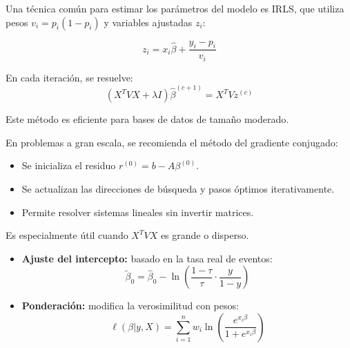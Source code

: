 \documentclass[12pt]{article}
\begin{document}
Una técnica común para estimar los parámetros del modelo es IRLS, que utiliza pesos $v_i = p_i(1 - p_i)$ y variables ajustadas $z_i$:

\begin{equation}
    z_i = x_i \hat{\beta} + \frac{y_i - p_i}{v_i}
\end{equation}

En cada iteración, se resuelve:
\begin{equation}
    (X^T V X + \lambda I) \hat{\beta}^{(c+1)} = X^T V z^{(c)}
\end{equation}

Este método es eficiente para bases de datos de tamaño moderado.

En problemas a gran escala, se recomienda el método del gradiente conjugado:

\begin{itemize}
    \item Se inicializa el residuo $r^{(0)} = b - A\beta^{(0)}$.
    \item Se actualizan las direcciones de búsqueda y pasos óptimos iterativamente.
    \item Permite resolver sistemas lineales sin invertir matrices.
\end{itemize}

Es especialmente útil cuando $X^T V X$ es grande o disperso.

\begin{itemize}
    \item \textbf{Ajuste del intercepto:} basado en la tasa real de eventos:
    \begin{equation}
        \tilde{\beta}_0 = \hat{\beta}_0 - \ln \left( \frac{1 - \tau}{\tau} \cdot \frac{y}{1 - y} \right)
    \end{equation}
    \item \textbf{Ponderación:} modifica la verosimilitud con pesos:
    \begin{equation}
        \ell(\beta|y,X) = \sum_{i=1}^n w_i \ln \left( \frac{e^{x_i \beta}}{1 + e^{x_i \beta}} \right)
    \end{equation}
\end{itemize}
\end{document}
